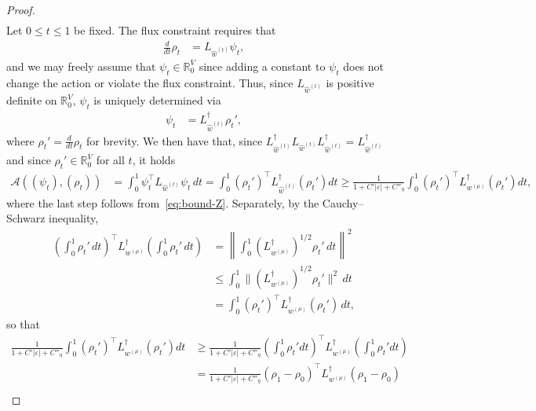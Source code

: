 \documentclass[10pt,a4paper]{amsart}
\begin{document}
\begin{proof}
\begin{align}
        \end{align}
    Let $0\le t\le 1$ be fixed. The flux constraint requires that
        \begin{align*}
            \frac{d}{dt}\rho_t &= L_{\widehat{w}^{(t)}} \psi_t,
        \end{align*}
    and we may freely assume that $\psi_t\in\mathbb{R}^{V}_0$ since adding a constant to $\psi_t$ does not change the action or violate the flux constraint. Thus, since $L_{\widehat{w}^{(t)}}$ is positive definite on $\mathbb{R}^{V}_0$, $\psi_t$ is uniquely determined via
        \begin{align}\label{eq:psi-t-uniquely-determined}
            \psi_t &= L_{\widehat{w}^{(t)}}^{\dagger} \rho_{t}',
        \end{align}
    where $\rho_{t}' = \frac{d}{dt} \rho_t$ for brevity. We then have that, since $ L_{\widehat{w}^{(t)}}^{\dagger}  L_{\widehat{w}^{(t)}}  L_{\widehat{w}^{(t)}}^{\dagger}  =  L_{\widehat{w}^{(t)}}^{\dagger} $ and since $\rho_{t}'\in\mathbb{R}^{V}_0$ for all $t$, it holds
        \begin{align*}
            \mathcal{A}((\psi_t), (\rho_t)) &= \int_0^1 \psi_t^\top L_{\widehat{w}^{(t)}} \psi_t \, dt = \int_0^1 \left(\rho_{t}'\right)^\top L_{\widehat{w}^{(t)}}^{\dagger} \left(\rho_{t}'\right) dt \geq \frac{1}{1 + C'|\varepsilon| + C''_{\eta}} \int_0^1 (\rho_t')^\top L_{w^{(\mu)}}^\dagger (\rho_t') dt,
        \end{align*}
    where the last step follows from~\cref{eq:bound-Z}. Separately, by the Cauchy--Schwarz inequality,
        \begin{align*}
            \left(\int_0^1 \rho_t' \,dt\right)^\top L_{w^{(\mu)}}^{\dagger} \left(\int_0^1 \rho_t' \,dt\right) &= \left\|\int_0^1 (L_{w^{(\mu)}}^{\dagger})^{1/2} \rho_t'\, dt \right\|^2 \\
            &\leq \int_0^1 \|(L_{w^{(\mu)}}^{\dagger})^{1/2} \rho_t'\|^2 \,dt\\
            &= \int_0^1 (\rho_t')^\top L_{w^{(\mu)}}^\dagger (\rho_t') \,dt,
        \end{align*}
    so that
        \begin{align*}
            \frac{1}{1 + C'|\varepsilon| + C''_{\eta}} \int_0^1 (\rho_t')^\top L_{w^{(\mu)}}^\dagger (\rho_t') dt &\geq \frac{1}{1 + C'|\varepsilon| + C''_{\eta}} \left(\int_0^1 \rho_t' dt\right)^\top L_{w^{(\mu)}}^{\dagger} \left(\int_0^1 \rho_t' dt\right)\\
            &= \frac{1}{1 + C'|\varepsilon| + C''_{\eta}} (\rho_1 - \rho_0)^\top L_{w^{(\mu)}}^{\dagger} (\rho_1 - \rho_0) \\

\end{align*}
\end{proof}
\end{document}
